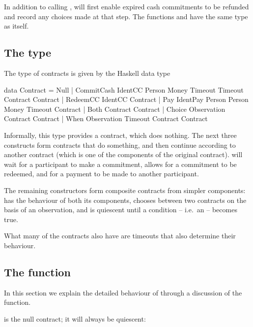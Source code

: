 \documentclass[runningheads]{llncs}
\begin{document}
In addition to 
calling ,  will first enable expired cash commitments to be refunded and record any choices made at that step. 
The functions  and  have the same type as  itself.





\subsection{The  type}

The type of contracts is given by the Haskell data type

\begin{haskellcode}
data Contract =
   Null |
   CommitCash IdentCC Person Money Timeout Timeout Contract Contract |  
   RedeemCC IdentCC Contract |
   Pay IdentPay Person Person Money Timeout Contract |  
   Both Contract Contract |
   Choice Observation Contract Contract |
   When Observation Timeout Contract Contract   
   \end{haskellcode}
Informally, this type provides a  contract, which does nothing. The next three constructs form contracts that do something, and then continue according to another contract (which is one of the components of the original contract).  will wait for a participant to make a commitment,  
 allows for a commitment to be redeemed, and  for a payment to be made to another participant. 

The remaining constructors form composite contracts from simpler components:  has the behaviour of both its components,  chooses between two contracts on the basis of an observation, and  is quiescent until a condition -- i.e.\ an  -- becomes true.

What many of the contracts also have are timeouts that also determine their behaviour. 
\subsection{The  function}

In this section we explain the detailed behaviour of  through a discussion of the  function.

\smallskip
\noindent
{} is the null contract; it will always be quiescent:
\end{document}
